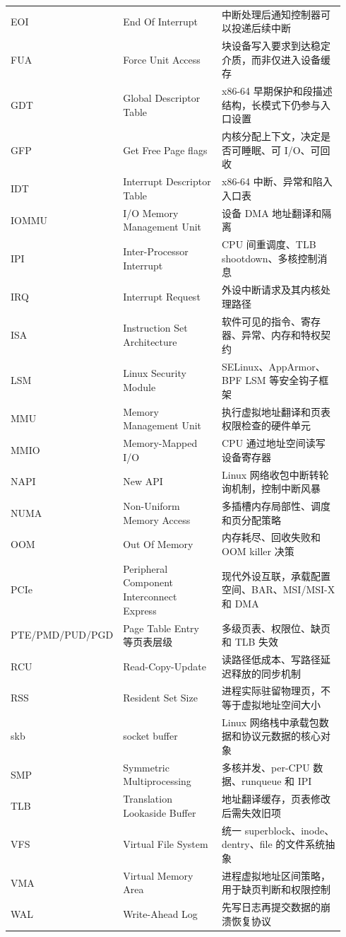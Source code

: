 \begin{longtable}{|L{0.22\linewidth}|L{0.31\linewidth}|L{0.41\linewidth}|}
EOI & End Of Interrupt & 中断处理后通知控制器可以投递后续中断 \\\tablerowrule
FUA & Force Unit Access & 块设备写入要求到达稳定介质，而非仅进入设备缓存 \\\tablerowrule
GDT & Global Descriptor Table & x86-64 早期保护和段描述结构，长模式下仍参与入口设置 \\\tablerowrule
GFP & Get Free Page flags & 内核分配上下文，决定是否可睡眠、可 I/O、可回收 \\\tablerowrule
IDT & Interrupt Descriptor Table & x86-64 中断、异常和陷入入口表 \\\tablerowrule
IOMMU & I/O Memory Management Unit & 设备 DMA 地址翻译和隔离 \\\tablerowrule
IPI & Inter-Processor Interrupt & CPU 间重调度、TLB shootdown、多核控制消息 \\\tablerowrule
IRQ & Interrupt Request & 外设中断请求及其内核处理路径 \\\tablerowrule
ISA & Instruction Set Architecture & 软件可见的指令、寄存器、异常、内存和特权契约 \\\tablerowrule
LSM & Linux Security Module & SELinux、AppArmor、BPF LSM 等安全钩子框架 \\\tablerowrule
MMU & Memory Management Unit & 执行虚拟地址翻译和页表权限检查的硬件单元 \\\tablerowrule
MMIO & Memory-Mapped I/O & CPU 通过地址空间读写设备寄存器 \\\tablerowrule
NAPI & New API & Linux 网络收包中断转轮询机制，控制中断风暴 \\\tablerowrule
NUMA & Non-Uniform Memory Access & 多插槽内存局部性、调度和页分配策略 \\\tablerowrule
OOM & Out Of Memory & 内存耗尽、回收失败和 OOM killer 决策 \\\tablerowrule
PCIe & Peripheral Component Interconnect Express & 现代外设互联，承载配置空间、BAR、MSI/MSI-X 和 DMA \\\tablerowrule
PTE/PMD/PUD/PGD & Page Table Entry 等页表层级 & 多级页表、权限位、缺页和 TLB 失效 \\\tablerowrule
RCU & Read-Copy-Update & 读路径低成本、写路径延迟释放的同步机制 \\\tablerowrule
RSS & Resident Set Size & 进程实际驻留物理页，不等于虚拟地址空间大小 \\\tablerowrule
skb & socket buffer & Linux 网络栈中承载包数据和协议元数据的核心对象 \\\tablerowrule
SMP & Symmetric Multiprocessing & 多核并发、per-CPU 数据、runqueue 和 IPI \\\tablerowrule
TLB & Translation Lookaside Buffer & 地址翻译缓存，页表修改后需失效旧项 \\\tablerowrule
VFS & Virtual File System & 统一 superblock、inode、dentry、file 的文件系统抽象 \\\tablerowrule
VMA & Virtual Memory Area & 进程虚拟地址区间策略，用于缺页判断和权限控制 \\\tablerowrule
WAL & Write-Ahead Log & 先写日志再提交数据的崩溃恢复协议 \\
\bottomrule
\end{longtable}
